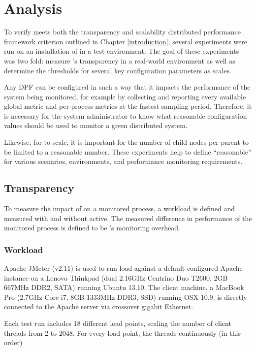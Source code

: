 \chapter{Analysis}
\label{analysis}

To verify \dcamp meets both the transparency and scalability distributed performance framework criterion outlined in
Chapter \ref{introduction}, several experiments were run on an installation of \dcamp in a test environment. The goal of
these experiments was two fold: measure \dcampns's transparency in a real-world environment as well as determine the
thresholds for several key configuration parameters as \dcamp scales.

Any DPF can be configured in such a way that it impacts the performance of the system being monitored, for example by
collecting and reporting every available global metric and per-process metrics at the fastest sampling period.
Therefore, it is necessary for the system administrator to know what reasonable configuration values should be used to
monitor a given distributed system.

Likewise, for \dcamp to scale, it is important for the number of child nodes per parent to be limited to a reasonable
number. These experiments help to define ``reasonable'' for various scenarios, environments, and performance monitoring
requirements.

\section{Transparency}

To measure the impact of \dcamp on a monitored process, a workload is defined and measured with and without \dcamp
active. The measured difference in performance of the monitored process is defined to be \dcampns's monitoring overhead.

\subsection{Workload}

Apache JMeter\cite{jmeter} (v2.11) is used to run load against a default-configured Apache instance on a Lenovo Thinkpad
(dual 2.16GHz Centrino Duo T2600, 2GB 667MHz DDR2, SATA) running Ubuntu 13.10. The client machine, a MacBook Pro (2.7GHz
Core i7, 8GB 1333MHz DDR3, SSD) running OSX 10.9, is directly connected to the Apache server via crossover gigabit
Ethernet.

Each test run includes 18 different load points, scaling the number of client threads from 2 to 2048. For every load
point, the threads continuously (in this order)


